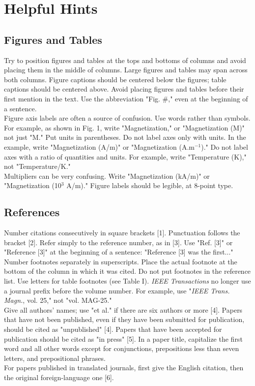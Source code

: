 \documentclass[conference,letterpaper]{IEEEtran}
\begin{document}
\section{Helpful Hints}
\subsection{Figures and Tables}
Try to position figures and tables at the tops and bottoms of
columns and avoid placing them in the middle of columns. Large
figures and tables may span across both columns. Figure captions
should be centered below the figures; table captions should be
centered above. Avoid placing figures and tables before their
first mention in the text. Use the abbreviation "Fig. \#," even at
the beginning of a sentence.\\
\indent
Figure axis labels are often a source
of confusion. Use words rather than symbols. For example, as shown
in Fig. 1, write "Magnetization," or "Magnetization (M)" not just
"M."  Put units in parentheses.  Do not label axes only with
units.  In the example, write "Magnetization (A/m)" or
"Magnetization (A.m$^{-1}$)." Do not label axes with a ratio of
quantities and units. For example, write "Temperature (K)," not
"Temperature/K."\\
\indent
Multipliers can be very confusing. Write
"Magnetization (kA/m)" or "Magnetization (10$^{3}$ A/m)." Figure labels
should be legible, at 8-point type.



\subsection{References}
Number citations consecutively in square brackets [1]. Punctuation
follows the bracket [2]. Refer simply to the reference number, as
in [3]. Use "Ref. [3]" or "Reference [3]" at the beginning of a
sentence: "Reference [3] was the first..."\\
\indent
Number footnotes
separately in superscripts. Place the actual footnote at the
bottom of the column in which it was cited. Do not put footnotes
in the reference list. Use letters for table footnotes (see Table
I). \textit{IEEE Transactions} no longer use a journal prefix before the
volume number. For example, use "\textit{IEEE Trans. Magn.}, vol. 25," not
"vol. MAG-25."\\
\indent
Give all authors' names; use "et al." if there are
six authors or more [4]. Papers that have not been published, even
if they have been submitted for publication, should be cited as
"unpublished" [4]. Papers that have been accepted for publication
should be cited as "in press" [5]. In a paper title, capitalize
the first word and all other words except for conjunctions,
prepositions less than seven letters, and prepositional phrases.\\
\indent
For papers published in translated journals, first give the
English citation, then the original foreign-language one [6].
\end{document}
